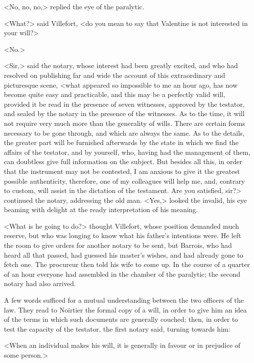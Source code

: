  <No, no, no,> replied the eye of the paralytic. 

 <What?> said Villefort, <do you mean to say that Valentine is not interested in your will?> 

 <No.> 

 <Sir,> said the notary, whose interest had been greatly excited, and who had resolved on publishing far and wide the account of this extraordinary and picturesque scene, <what appeared so impossible to me an hour ago, has now become quite easy and practicable, and this may be a perfectly valid will, provided it be read in the presence of seven witnesses, approved by the testator, and sealed by the notary in the presence of the witnesses. As to the time, it will not require very much more than the generality of wills. There are certain forms necessary to be gone through, and which are always the same. As to the details, the greater part will be furnished afterwards by the state in which we find the affairs of the testator, and by yourself, who, having had the management of them, can doubtless give full information on the subject. But besides all this, in order that the instrument may not be contested, I am anxious to give it the greatest possible authenticity, therefore, one of my colleagues will help me, and, contrary to custom, will assist in the dictation of the testament. Are you satisfied, sir?> continued the notary, addressing the old man.  <Yes,> looked the invalid, his eye beaming with delight at the ready interpretation of his meaning. 

 <What is he going to do?> thought Villefort, whose position demanded much reserve, but who was longing to know what his father's intentions were. He left the room to give orders for another notary to be sent, but Barrois, who had heard all that passed, had guessed his master's wishes, and had already gone to fetch one. The procureur then told his wife to come up. In the course of a quarter of an hour everyone had assembled in the chamber of the paralytic; the second notary had also arrived. 

 A few words sufficed for a mutual understanding between the two officers of the law. They read to Noirtier the formal copy of a will, in order to give him an idea of the terms in which such documents are generally couched; then, in order to test the capacity of the testator, the first notary said, turning towards him: 

 <When an individual makes his will, it is generally in favour or in prejudice of some person.> 

